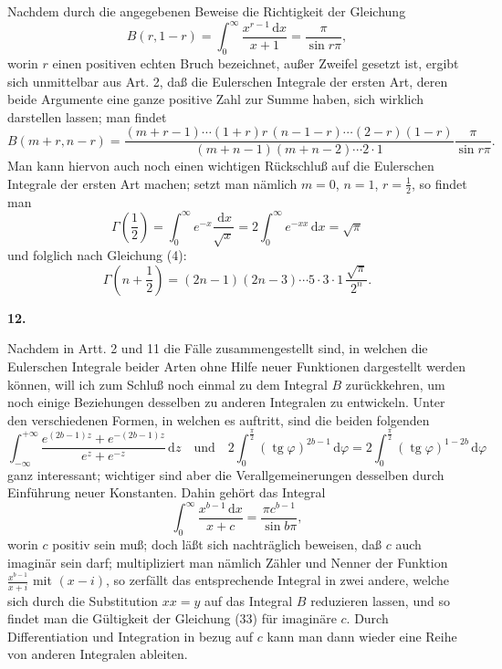 \documentclass[11pt]{article}
\newcommand{\dd}{\,\mathrm d}
\newcommand{\art}[1]{\bigskip\begin{center}\large\bfseries #1.\end{center}\nopagebreak}
\newcommand{\tg}{\operatorname{tg}}
\begin{document}
Nachdem durch die angegebenen Beweise die Richtigkeit der Gleichung
\[
B(r,1-r)=\int_0^\infty\frac{x^{r-1}\dd x}{x+1}
=\frac{\pi}{\sin r\pi},
\]
worin $r$ einen positiven echten Bruch bezeichnet, außer Zweifel gesetzt ist, ergibt sich unmittelbar aus Art. 2, daß die Eulerschen Integrale der ersten Art, deren beide Argumente eine ganze positive Zahl zur Summe haben, sich wirklich darstellen lassen; man findet
\begin{equation}
B(m+r,n-r)=
\frac{(m+r-1)\cdots(1+r)r\,(n-1-r)\cdots(2-r)(1-r)}
     {(m+n-1)(m+n-2)\cdots2\cdot1}
\frac{\pi}{\sin r\pi}.
\tag{30}
\end{equation}
Man kann hiervon auch noch einen wichtigen Rückschluß auf die Eulerschen Integrale der ersten Art machen; setzt man nämlich $m=0$, $n=1$, $r=\frac12$, so findet man
\begin{equation}
\Gamma\!\left(\frac12\right)
=\int_0^\infty e^{-x}\frac{\dd x}{\sqrt{x}}
=2\int_0^\infty e^{-xx}\dd x=\sqrt{\pi}
\tag{31}
\end{equation}
und folglich nach Gleichung (4):
\begin{equation}
\Gamma\!\left(n+\frac12\right)
=(2n-1)(2n-3)\cdots5\cdot3\cdot1\,\frac{\sqrt{\pi}}{2^n}.
\tag{32}
\end{equation}

\art{12}

Nachdem in Artt. 2 und 11 die Fälle zusammengestellt sind, in welchen die Eulerschen Integrale beider Arten ohne Hilfe neuer Funktionen dargestellt werden können, will ich zum Schluß noch einmal zu dem Integral $B$ zurückkehren, um noch einige Beziehungen desselben zu anderen Integralen zu entwickeln. Unter den verschiedenen Formen, in welchen es auftritt, sind die beiden folgenden
\[
\int_{-\infty}^{+\infty}
\frac{e^{(2b-1)z}+e^{-(2b-1)z}}{e^z+e^{-z}}\dd z
\quad\text{und}\quad
2\int_0^{\frac{\pi}{2}}(\tg\varphi)^{2b-1}\dd\varphi
=2\int_0^{\frac{\pi}{2}}(\tg\varphi)^{1-2b}\dd\varphi
\]
ganz interessant; wichtiger sind aber die Verallgemeinerungen desselben durch Einführung neuer Konstanten. Dahin gehört das Integral
\begin{equation}
\int_0^\infty\frac{x^{b-1}\dd x}{x+c}
=\frac{\pi c^{b-1}}{\sin b\pi},
\tag{33}
\end{equation}
worin $c$ positiv sein muß; doch läßt sich nachträglich beweisen, daß $c$ auch imaginär sein darf; multipliziert man nämlich Zähler und Nenner der Funktion $\frac{x^{b-1}}{x+i}$ mit $(x-i)$, so zerfällt das entsprechende Integral in zwei andere, welche sich durch die Substitution $xx=y$ auf das Integral $B$ reduzieren lassen, und so findet man die Gültigkeit der Gleichung (33) für imaginäre $c$. Durch Differentiation und Integration in bezug auf $c$ kann man dann wieder eine Reihe von anderen Integralen ableiten.
\end{document}
